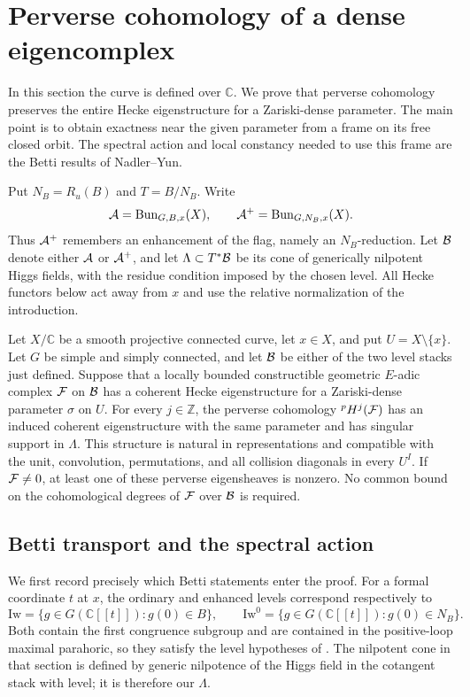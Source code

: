 \section{Perverse cohomology of a dense eigencomplex}
\label{sec:perverse}

In this section the curve is defined over $\mathbb C$.  We prove that
perverse cohomology preserves the entire Hecke eigenstructure for a
Zariski-dense parameter.  The main point is to obtain exactness near the
given parameter from a frame on its free closed orbit.  The spectral action
and local constancy needed to use this frame are the Betti results of
Nadler--Yun.

Put $N_B=R_u(B)$ and $T=B/N_B$.  Write
\[
 \mathcal A=\operatorname{Bun}_{G,B,x}(X),\qquad
 \mathcal A^+=\operatorname{Bun}_{G,N_B,x}(X).
\]
Thus $\mathcal A^+$ remembers an enhancement of the flag, namely an
$N_B$-reduction.  Let $\mathcal B$ denote either $\mathcal A$ or $\mathcal A^+$, and let
$\Lambda\subset T^*\mathcal B$ be its cone of generically nilpotent Higgs fields,
with the residue condition imposed by the chosen level.  All Hecke functors
below act away from $x$ and use the relative normalization of the
introduction.

\begin{proposition}\label{prop:perverse-eigen}
Let $X/\mathbb C$ be a smooth projective connected curve, let $x\in X$,
and put $U=X\setminus\{x\}$.  Let $G$ be simple and simply connected,
and let $\mathcal B$ be either of the two level stacks just defined.  Suppose
that a locally bounded constructible geometric $E$-adic complex $\mathcal F$
on $\mathcal B$ has a coherent Hecke eigenstructure for a Zariski-dense
parameter $\sigma$ on $U$.  For every $j\in\mathbb Z$, the perverse
cohomology ${}^pH^j(\mathcal F)$ has an induced coherent eigenstructure with
the same parameter and has singular support in $\Lambda$.  This
structure is natural in representations and compatible with the unit,
convolution, permutations, and all collision diagonals in every $U^I$.
If $\mathcal F\ne0$, at least one of these perverse eigensheaves is nonzero.
No common bound on the cohomological degrees of $\mathcal F$ over $\mathcal B$ is
required.
\end{proposition}

\subsection{Betti transport and the spectral action}

We first record precisely which Betti statements enter the proof.
For a formal coordinate $t$ at $x$, the ordinary and enhanced levels
correspond respectively to
\[
 \mathrm{Iw}=\{g\in G(\mathbb C[[t]]):g(0)\in B\},\qquad
 \mathrm{Iw}^{0}=\{g\in G(\mathbb C[[t]]):g(0)\in N_B\}.
\]
Both contain the first congruence subgroup and are contained in the
positive-loop maximal parahoric, so they satisfy the level hypotheses
of \cite[\S6.2]{NY}.  The nilpotent cone in that section is defined
by generic nilpotence of the Higgs field in the cotangent stack with
level; it is therefore our $\Lambda$.

